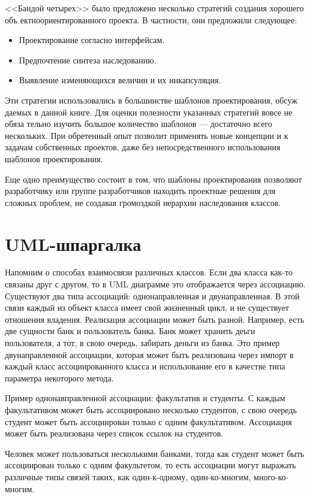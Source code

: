 \documentclass[10pt]{article}
\begin{document}
<<Бандой четырех>> было предложено несколько стратегий создания хорошего объ
ектноориентированного проекта. В частности, они предложили следующее:
\begin{itemize}
	\item Проектирование согласно интерфейсам.
	\item Предпочтение синтеза наследованию.
	\item Выявление изменяющихся величин и их инкапсуляция.
\end{itemize}

Эти стратегии использовались в большинстве шаблонов проектирования, обсуж
даемых в данной книге. Для оценки полезности указанных стратегий вовсе не обяза
тельно изучить большое количество шаблонов — достаточно всего нескольких. При
обретенный опыт позволит применять новые концепции и к задачам собственных
проектов, даже без непосредственного использования шаблонов проектирования.

Еще одно преимущество состоит в том, что шаблоны проектирования позволяют
разработчику или группе разработчиков находить проектные решения для сложных
проблем, не создавая громоздкой иерархии наследования классов.

\section{UML-шпаргалка}

Напомним о способах взаимосвязи различных классов.
Если два класса как-то связаны друг с другом, то
в UML диаграмме это отображается через ассоциацию.
Существуют два типа ассоциаций: однонаправленная и двунаправленная.
В этой связи каждый из объект класса имеет свой жизненный цикл, и не
существует отношения владения. Реализация ассоциации может быть разной.
Например, есть две сущности банк и пользователь банка. Банк может хранить
деьги пользователя, а тот, в свою очередь, забирать деньги из банка.
Это пример двунаправленной ассоциации, которая может быть реализована
через импорт в каждый класс ассоциированного класса и использование его
в качестве типа параметра некоторого метода.

Пример однонавправленной ассоциации: факультатив и студенты. С каждым факультативом
может быть ассоциировано несколько студентов, с свою очередь студент может
быть ассоциирован только с одним факультативом. Ассоциация может быть реализована
через список ссылок на студентов.

Человек может пользоваться несколькими банками, тогда как студент может быть
ассоциирован только с одним факультетом, то есть ассоциации могут выражать
различные типы связей таких, как один-к-одному, один-ко-многим, много-ко-многим.
\end{document}
